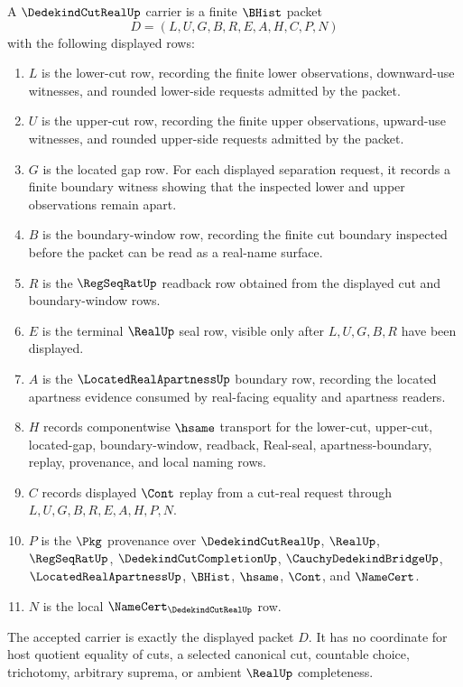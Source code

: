 \begin{definition}
\label{def:dedekind-cut-real-carrier}
A $\DedekindCutRealUp$ carrier is a finite $\BHist$ packet
$$
D=(L,U,G,B,R,E,A,H,C,P,N)
$$
with the following displayed rows:
\begin{enumerate}
\item $L$ is the lower-cut row, recording the finite lower observations, downward-use witnesses, and rounded lower-side requests admitted by the packet.
\item $U$ is the upper-cut row, recording the finite upper observations, upward-use witnesses, and rounded upper-side requests admitted by the packet.
\item $G$ is the located gap row. For each displayed separation request, it records a finite boundary witness showing that the inspected lower and upper observations remain apart.
\item $B$ is the boundary-window row, recording the finite cut boundary inspected before the packet can be read as a real-name surface.
\item $R$ is the $\RegSeqRatUp$ readback row obtained from the displayed cut and boundary-window rows.
\item $E$ is the terminal $\RealUp$ seal row, visible only after $L,U,G,B,R$ have been displayed.
\item $A$ is the $\LocatedRealApartnessUp$ boundary row, recording the located apartness evidence consumed by real-facing equality and apartness readers.
\item $H$ records componentwise $\hsame$ transport for the lower-cut, upper-cut, located-gap, boundary-window, readback, Real-seal, apartness-boundary, replay, provenance, and local naming rows.
\item $C$ records displayed $\Cont$ replay from a cut-real request through $L,U,G,B,R,E,A,H,P,N$.
\item $P$ is the $\Pkg$ provenance over $\DedekindCutRealUp$, $\RealUp$, $\RegSeqRatUp$, $\DedekindCutCompletionUp$, $\CauchyDedekindBridgeUp$, $\LocatedRealApartnessUp$, $\BHist$, $\hsame$, $\Cont$, and $\NameCert$.
\item $N$ is the local $\NameCert_{\DedekindCutRealUp}$ row.
\end{enumerate}
The accepted carrier is exactly the displayed packet $D$. It has no coordinate for host quotient equality of cuts, a selected canonical cut, countable choice, trichotomy, arbitrary suprema, or ambient $\RealUp$ completeness.
\end{definition}


